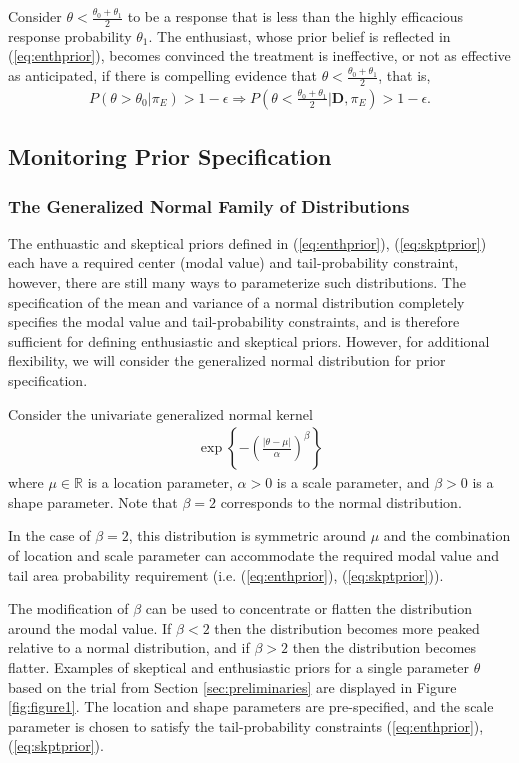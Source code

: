 \documentclass[12pt]{article}
\begin{document}
Consider $\theta<\frac{\theta_0+\theta_1}{2}$ to be a response that is less than the highly efficacious response probability $\theta_1$. The enthusiast, whose prior belief is reflected in (\ref{eq:enthprior}), becomes convinced the treatment is ineffective, or not as effective as anticipated, if there is compelling evidence that $\theta<\frac{\theta_0+\theta_1}{2}$, that is, 
\begin{align}
P(\theta>\theta_0|\pi_{E})>1-\epsilon\Rightarrow P\left(\theta<\frac{\theta_0+\theta_1}{2}\Big| \mathbf{D},\pi_{E}\right)>1-\epsilon.
\end{align}
%
\subsection{Monitoring Prior Specification}
\subsubsection{The Generalized Normal Family of Distributions}
The enthuastic and skeptical priors defined in (\ref{eq:enthprior}), (\ref{eq:skptprior}) each have a required center (modal value) and tail-probability constraint, however, there are still many ways to parameterize such distributions. The specification of the mean and variance of a normal distribution completely specifies the modal value and tail-probability constraints, and is therefore sufficient for defining enthusiastic and skeptical priors. However, for additional flexibility, we will consider the generalized normal distribution for prior specification.

Consider the univariate generalized normal kernel 
\begin{align}\label{eq:generalizednormalkernel}
\exp\left\{-\left(\frac{|\theta-\mu|}{\alpha}\right)^\beta\right\}
\end{align} where $\mu\in\mathbb{R}$ is a location parameter, $\alpha>0$ is a scale parameter, and $\beta>0$ is a shape parameter. Note that $\beta=2$ corresponds to the normal distribution. 

In the case of $\beta=2$, this distribution is symmetric around $\mu$ and the combination of location and scale parameter can accommodate the required modal value and tail area probability requirement (i.e. (\ref{eq:enthprior}), (\ref{eq:skptprior})). 

The modification of $\beta$ can be used to concentrate or flatten the distribution around the modal value. If $\beta<2$ then the distribution becomes more peaked relative to a normal distribution, and if $\beta>2$ then the distribution becomes flatter. Examples of skeptical and enthusiastic priors for a single parameter $\theta$ based on the trial from Section \ref{sec:preliminaries} are displayed in Figure \ref{fig:figure1}. The location and shape parameters are pre-specified, and the scale parameter is chosen to satisfy the tail-probability constraints (\ref{eq:enthprior}), (\ref{eq:skptprior}).
\end{document}
